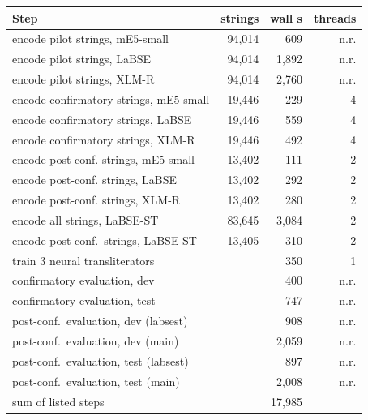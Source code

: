 \begin{tabular}{lrrr}
\toprule
Step & strings & wall s & threads \\
\midrule
encode pilot strings, mE5-small & 94,014 & 609 & n.r. \\
encode pilot strings, LaBSE & 94,014 & 1,892 & n.r. \\
encode pilot strings, XLM-R & 94,014 & 2,760 & n.r. \\
encode confirmatory strings, mE5-small & 19,446 & 229 & 4 \\
encode confirmatory strings, LaBSE & 19,446 & 559 & 4 \\
encode confirmatory strings, XLM-R & 19,446 & 492 & 4 \\
encode post-conf. strings, mE5-small & 13,402 & 111 & 2 \\
encode post-conf. strings, LaBSE & 13,402 & 292 & 2 \\
encode post-conf. strings, XLM-R & 13,402 & 280 & 2 \\
encode all strings, LaBSE-ST & 83,645 & 3,084 & 2 \\
encode post-conf.\ strings, LaBSE-ST & 13,405 & 310 & 2 \\
train 3 neural transliterators &  & 350 & 1 \\
confirmatory evaluation, dev &  & 400 & n.r. \\
confirmatory evaluation, test &  & 747 & n.r. \\
post-conf.\ evaluation, dev (labsest) &  & 908 & n.r. \\
post-conf.\ evaluation, dev (main) &  & 2,059 & n.r. \\
post-conf.\ evaluation, test (labsest) &  & 897 & n.r. \\
post-conf.\ evaluation, test (main) &  & 2,008 & n.r. \\
\midrule
sum of listed steps & & 17,985 & \\
\bottomrule
\end{tabular}
